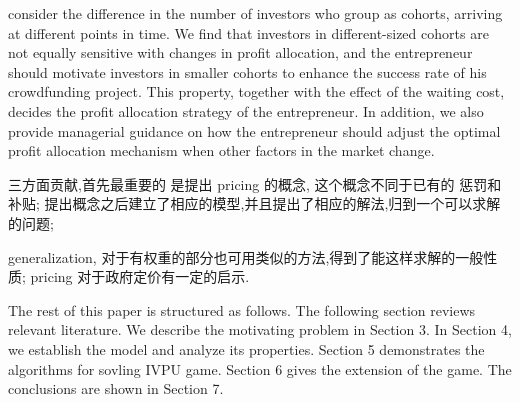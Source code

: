 consider the difference in the number of investors who group as cohorts, arriving at different points in time. We find that investors in different-sized cohorts are not equally sensitive with changes in profit allocation, and the entrepreneur should motivate investors in smaller cohorts to enhance the success rate of his crowdfunding project. This property, together with the effect of the waiting cost, decides the profit allocation strategy of the entrepreneur. In addition, we also provide managerial guidance on how the entrepreneur should adjust the optimal profit allocation mechanism when other factors in the market change.


三方面贡献,首先最重要的 是提出 pricing 的概念, 这个概念不同于已有的 惩罚和补贴;
提出概念之后建立了相应的模型,并且提出了相应的解法,归到一个可以求解的问题;

generalization, 对于有权重的部分也可用类似的方法,得到了能这样求解的一般性质;
pricing 对于政府定价有一定的启示.


The rest of this paper is structured as follows. The following section reviews relevant literature. We describe the motivating problem in Section 3. In Section 4, we establish the model and analyze its properties. Section 5 demonstrates the algorithms for sovling IVPU game. Section 6 gives the extension of the game. The conclusions are shown in Section 7.
